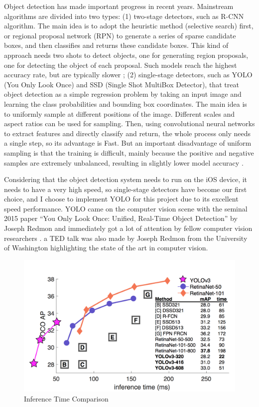 \documentclass{article}
\begin{document}
Object detection has made important progress in recent years. Mainstream algorithms are divided into two types: (1) two-stage detectors, such as R-CNN algorithm. The main idea is to adopt the heuristic method (selective search) first, or regional proposal network (RPN) to generate a series of sparse candidate boxes, and then classifies and returns these candidate boxes. This kind of approach needs two shots to detect objects, one for generating region proposals, one for detecting the object of each proposal. Such models reach the highest accuracy rate, but are typically slower \cite{he2017mask}; (2) single-stage detectors, such as YOLO (You Only Look Once) and SSD (Single Shot MultiBox Detector), that treat object detection as a simple regression problem by taking an input image and learning the class probabilities and bounding box coordinates. The main idea is to uniformly sample at different positions of the image. Different scales and aspect ratios can be used for sampling. Then, using convolutional neural networks to extract features and directly classify and return, the whole process only needs a single step, so its advantage is Fast. But an important disadvantage of uniform sampling is that the training is difficult, mainly because the positive and negative samples are extremely unbalanced, resulting in slightly lower model accuracy \cite{soviany2018optimizing}.

Considering that the object detection system needs to run on the iOS device, it needs to have a very high speed, so single-stage detectors have become our first choice, and I choose to implement YOLO for this project due to its excellent speed performance. YOLO came on the computer vision scene with the seminal 2015 paper “You Only Look Once: Unified, Real-Time Object Detection” by Joseph Redmon and immediately got a lot of attention by fellow computer vision researchers \cite{YOLO}. a TED talk was also made by Joseph Redmon from the University of Washington highlighting the state of the art in computer vision.

\begin{figure}[h]
\centering
\includegraphics[scale=0.25]{YOLOv3.png}
\caption{Inference Time Comparison\cite{YOLO}}
\label{fig:YOLOv3}
\end{figure}
\end{document}
